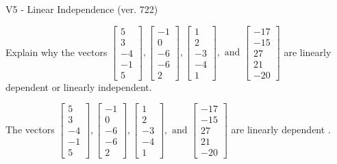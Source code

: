 \begin{exercise}
  \begin{exerciseTitle}V5 - Linear Independence (ver. 722)\end{exerciseTitle}
  \begin{exerciseStatement}
    Explain why the vectors \(\left[\begin{array}{r}
5 \\
3 \\
-4 \\
-1 \\
5
\end{array}\right] , \left[\begin{array}{r}
-1 \\
0 \\
-6 \\
-6 \\
2
\end{array}\right] , \left[\begin{array}{r}
1 \\
2 \\
-3 \\
-4 \\
1
\end{array}\right] , \text{ and } \left[\begin{array}{r}
-17 \\
-15 \\
27 \\
21 \\
-20
\end{array}\right]\) are linearly dependent or linearly independent.	


  \end{exerciseStatement}
  \begin{exerciseAnswer}
   The vectors \(\left[\begin{array}{r}
5 \\
3 \\
-4 \\
-1 \\
5
\end{array}\right] , \left[\begin{array}{r}
-1 \\
0 \\
-6 \\
-6 \\
2
\end{array}\right] , \left[\begin{array}{r}
1 \\
2 \\
-3 \\
-4 \\
1
\end{array}\right] , \text{ and } \left[\begin{array}{r}
-17 \\
-15 \\
27 \\
21 \\
-20
\end{array}\right]\) are 
  	 linearly dependent  .
  


  \end{exerciseAnswer}
\end{exercise}